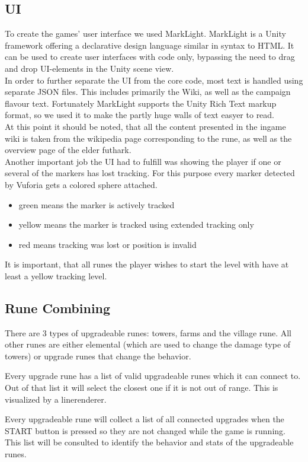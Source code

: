 \subsection{UI}
To create the games' user interface we used MarkLight.\cite{marklight} MarkLight is a Unity framework offering a declarative design language similar in syntax to HTML. It can be used to create user interfaces with code only, bypassing the need to drag and drop UI-elements in the Unity scene view. \\
In order to further separate the UI from the core code, most text is handled using separate JSON files. This includes primarily the Wiki, as well as the campaign flavour text. Fortunately MarkLight supports the Unity Rich Text markup format, so we used it to make the partly huge walls of text easyer to read.\cite{unity-rich-text}\\
At this point it should be noted, that all the content presented in the ingame wiki is taken from the wikipedia page corresponding to the rune, as well as the overview page of the elder futhark.\cite{elder-futhark}\\
Another important job the UI had to fulfill was showing the player if one or several of the markers has lost tracking. For this purpose every marker detected by Vuforia gets a colored sphere attached.
\begin{itemize}
	\item green means the marker is actively tracked
	\item yellow means the marker is tracked using extended tracking only
	\item red means tracking was lost or position is invalid
\end{itemize}
It is important, that all runes the player wishes to start the level with have at least a yellow tracking level.

\subsection{Rune Combining}
There are 3 types of upgradeable runes: towers, farms and the village rune. All other runes are either elemental (which are used to change the damage type of towers) or upgrade runes that change the behavior.

Every upgrade rune has a list of valid upgradeable runes which it can connect to. Out of that list it will select the closest one if it is not out of range. This is visualized by a linerenderer.

Every upgradeable rune will collect a list of all connected upgrades when the START button is pressed so they are not changed while the game is running. This list will be consulted to identify the behavior and stats of the upgradeable runes.


